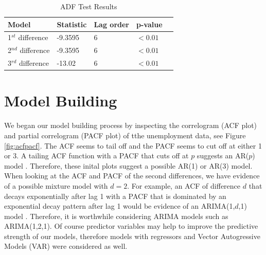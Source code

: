 \documentclass[twoside,twocolumn]{article}
\begin{document}
	 \begin{table}[H]
		 \centering
		 \caption{ADF Test Results}
		 \label{tab:ADF}
		 \begin{tabular}{lllll}
		 \hline
		 \textbf{Model} & \textbf{Statistic} & \textbf{Lag order} & \textbf{p-value}\\ \hline
		  1\(^{st}\) difference &  -9.3595 & 6 &\( < 0.01\)\\
		  2\(^{nd}\) difference &  -9.3595 & 6 & \( < 0.01\)\\			  
		  3\(^{rd}\) difference &  -13.02 & 6 & \( < 0.01\)\\		 \hline
		 \end{tabular}
		 \end{table}

  



\section{Model Building}
  
  We began our model building process by inspecting the correlogram (ACF plot) and partial correlogram (PACF plot) of tthe unemployment data, see Figure \ref{fig:acfpacf}. The ACF seems to tail off and the PACF seems to cut off at either 1 or 3.  A tailing ACF function with a PACF that cuts off at \(p\) suggests an AR(\(p\)) model \citep{Box2008}. Therefore, these inital plots suggest a possible AR(1) or AR(3) model. When looking at the ACF and PACF of the second differences, we have evidence of a possible mixture model with \(d=2\). For example, an ACF of difference \(d\) that decays exponentially after lag 1 with a PACF that is dominated by an exponential decay pattern after lag 1 would be evidence of an ARIMA(1,\(d\),1) model . Therefore, it is worthwhile considering ARIMA models such as ARIMA(1,2,1). Of course predictor variables may help to improve the predictive strength of our models, therefore models with regressors and Vector Autogressive Models (VAR) were considered as well.
  
\end{document}
